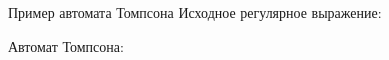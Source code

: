 \begin{frame}{Пример автомата Томпсона}
    Исходное регулярное выражение:

    Автомат Томпсона:

\end{frame}